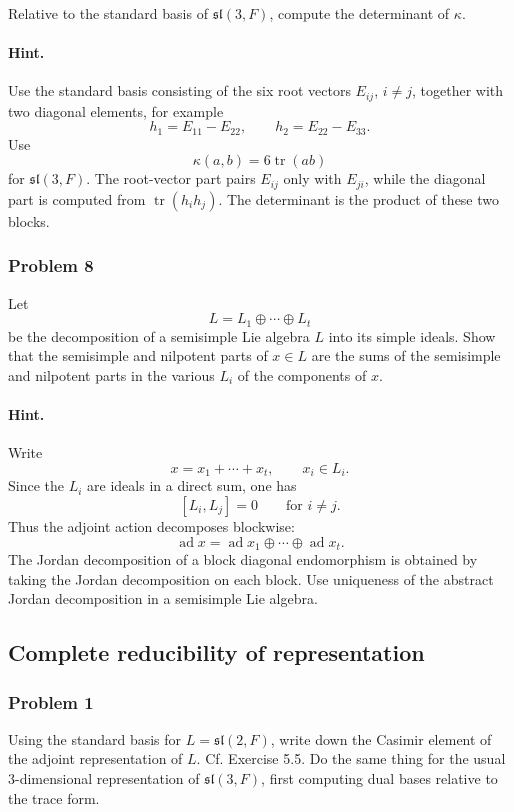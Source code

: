 \documentclass[12pt, a4paper]{article}
\begin{document}
Relative to the standard basis of \(\mathfrak{sl}(3,F)\), compute the
determinant of \(\kappa\).

\paragraph{Hint.}
Use the standard basis consisting of the six root vectors \(E_{ij}\), \(i\neq j\),
together with two diagonal elements, for example
\[
h_1=E_{11}-E_{22},
\qquad
h_2=E_{22}-E_{33}.
\]
Use
\[
\kappa(a,b)=6\operatorname{tr}(ab)
\]
for \(\mathfrak{sl}(3,F)\). The root-vector part pairs \(E_{ij}\) only with
\(E_{ji}\), while the diagonal part is computed from
\(\operatorname{tr}(h_i h_j)\). The determinant is the product of these two
blocks.

\subsubsection{Problem 8}

Let
\[
L=L_1\oplus\cdots\oplus L_t
\]
be the decomposition of a semisimple Lie algebra \(L\) into its simple ideals.
Show that the semisimple and nilpotent parts of \(x\in L\) are the sums of the
semisimple and nilpotent parts in the various \(L_i\) of the components of
\(x\).

\paragraph{Hint.}
Write
\[
x=x_1+\cdots+x_t,
\qquad x_i\in L_i.
\]
Since the \(L_i\) are ideals in a direct sum, one has
\[
[L_i,L_j]=0
\qquad\text{for }i\neq j.
\]
Thus the adjoint action decomposes blockwise:
\[
\operatorname{ad}x
=
\operatorname{ad}x_1\oplus\cdots\oplus \operatorname{ad}x_t.
\]
The Jordan decomposition of a block diagonal endomorphism is obtained by taking
the Jordan decomposition on each block. Use uniqueness of the abstract Jordan
decomposition in a semisimple Lie algebra.

\subsection{Complete reducibility of representation}
\subsubsection{Problem 1}

Using the standard basis for \(L=\mathfrak{sl}(2,F)\), write down the Casimir
element of the adjoint representation of \(L\). Cf. Exercise 5.5. Do the same
thing for the usual \(3\)-dimensional representation of \(\mathfrak{sl}(3,F)\),
first computing dual bases relative to the trace form.
\end{document}
